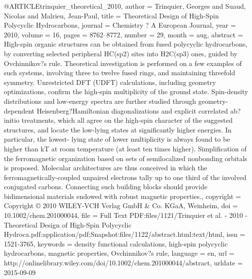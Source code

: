 @ARTICLE{trinquier_theoretical_2010,
  author = {Trinquier, Georges and Suaud, Nicolas and Malrieu, Jean-Paul},
  title = {Theoretical {Design} of {High}-{Spin} {Polycyclic} {Hydrocarbons}},
  journal = {Chemistry ? A European Journal},
  year = {2010},
  volume = {16},
  pages = {8762--8772},
  number = {29},
  month = aug,
  abstract = {High-spin organic structures can be obtained from fused polycyclic
	hydrocarbons, by converting selected peripheral HC(sp2) sites into
	H2C(sp3) ones, guided by Ovchinnikov?s rule. Theoretical investigation
	is performed on a few examples of such systems, involving three to
	twelve fused rings, and maintaining threefold symmetry. Unrestricted
	DFT (UDFT) calculations, including geometry optimizations, confirm
	the high-spin multiplicity of the ground state. Spin-density distributions
	and low-energy spectra are further studied through geometry-dependent
	Heisenberg?Hamiltonian diagonalizations and explicit correlated ab?initio
	treatments, which all agree on the high-spin character of the suggested
	structures, and locate the low-lying states at significantly higher
	energies. In particular, the lowest- lying state of lower multiplicity
	is always found to be higher than kT at room temperature (at least
	ten times higher). Simplification of the ferromagnetic organization
	based on sets of semilocalized nonbonding orbitals is proposed. Molecular
	architectures are thus conceived in which the ferromagnetically-coupled
	unpaired electrons tally up to one third of the involved conjugated
	carbons. Connecting such building blocks should provide bidimensional
	materials endowed with robust magnetic properties.},
  copyright = {Copyright © 2010 WILEY-VCH Verlag GmbH \& Co. KGaA, Weinheim},
  doi = {10.1002/chem.201000044},
  file = {Full Text PDF:files/1121/Trinquier et al. - 2010 - Theoretical Design of High-Spin Polycyclic Hydroca.pdf:application/pdf;Snapshot:files/1122/abstract.html:text/html},
  issn = {1521-3765},
  keywords = {density functional calculations, high-spin polycyclic hydrocarbons,
	magnetic properties, Ovchinnikov?s rule},
  language = {en},
  url = {http://onlinelibrary.wiley.com/doi/10.1002/chem.201000044/abstract},
  urldate = {2015-09-09}
}

